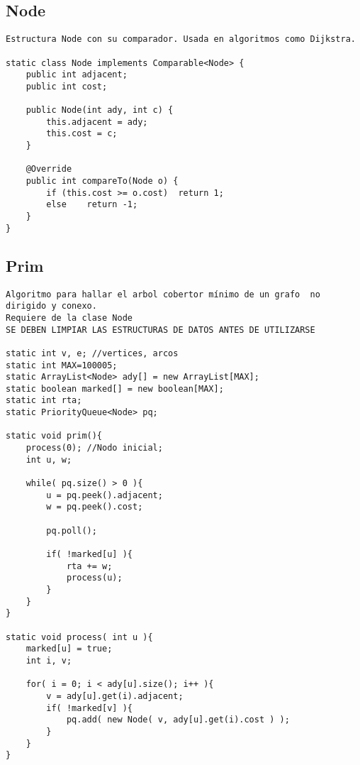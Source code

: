 \documentclass[10pt,letterpaper,twocolumn,twosided]{article}
\begin{document}
\subsection{Node}
\begin{lstlisting}
Estructura Node con su comparador. Usada en algoritmos como Dijkstra.

static class Node implements Comparable<Node> {
	public int adjacent;
    public int cost;
 
	public Node(int ady, int c) {
	    this.adjacent = ady;
	    this.cost = c;
    }
 
	@Override
	public int compareTo(Node o) {
	    if (this.cost >= o.cost)  return 1;
        else    return -1;
	}
} \end{lstlisting}

\subsection{Prim}
\begin{lstlisting}
Algoritmo para hallar el arbol cobertor mínimo de un grafo  no dirigido y conexo. 
Requiere de la clase Node
SE DEBEN LIMPIAR LAS ESTRUCTURAS DE DATOS ANTES DE UTILIZARSE

static int v, e; //vertices, arcos
static int MAX=100005; 
static ArrayList<Node> ady[] = new ArrayList[MAX];
static boolean marked[] = new boolean[MAX];
static int rta;
static PriorityQueue<Node> pq;

static void prim(){
	process(0); //Nodo inicial;
	int u, w;
 
	while( pq.size() > 0 ){
		u = pq.peek().adjacent;
		w = pq.peek().cost;
 
		pq.poll();
 
		if( !marked[u] ){
			rta += w;
			process(u);
		}
	}
}
 
static void process( int u ){
	marked[u] = true;
	int i, v;
 
	for( i = 0; i < ady[u].size(); i++ ){
		v = ady[u].get(i).adjacent;
        if( !marked[v] ){
			pq.add( new Node( v, ady[u].get(i).cost ) );	
		}
	}
}\end{lstlisting}
\end{document}
